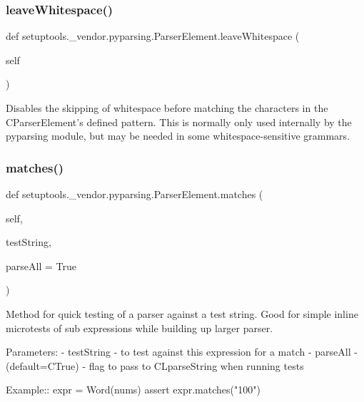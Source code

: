 \subsubsection{\texorpdfstring{leave\+Whitespace()}{leaveWhitespace()}}
{\footnotesize\ttfamily def setuptools.\+\_\+vendor.\+pyparsing.\+Parser\+Element.\+leave\+Whitespace (\begin{DoxyParamCaption}\item[{}]{self }\end{DoxyParamCaption})}

\begin{DoxyVerb}Disables the skipping of whitespace before matching the characters in the
C{ParserElement}'s defined pattern.  This is normally only used internally by
the pyparsing module, but may be needed in some whitespace-sensitive grammars.
\end{DoxyVerb}
 \mbox{\label{classsetuptools_1_1__vendor_1_1pyparsing_1_1_parser_element_a2afc43378181105cbee5ab5dd4ed776f}} 
\subsubsection{\texorpdfstring{matches()}{matches()}}
{\footnotesize\ttfamily def setuptools.\+\_\+vendor.\+pyparsing.\+Parser\+Element.\+matches (\begin{DoxyParamCaption}\item[{}]{self,  }\item[{}]{test\+String,  }\item[{}]{parse\+All = {\ttfamily True} }\end{DoxyParamCaption})}

\begin{DoxyVerb}Method for quick testing of a parser against a test string. Good for simple 
inline microtests of sub expressions while building up larger parser.
   
Parameters:
 - testString - to test against this expression for a match
 - parseAll - (default=C{True}) - flag to pass to C{L{parseString}} when running tests
    
Example::
    expr = Word(nums)
    assert expr.matches("100")
\end{DoxyVerb}
 \mbox{\label{classsetuptools_1_1__vendor_1_1pyparsing_1_1_parser_element_a9d224aee01e69b56fc10f467c860e78c}} 
